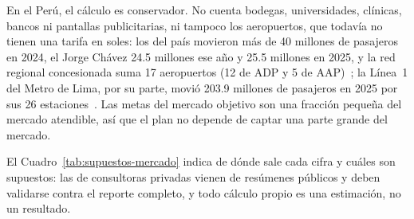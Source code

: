 \documentclass[12pt,a4paper]{article}
\begin{document}
En el Perú, el cálculo es conservador. No cuenta bodegas, universidades,
clínicas, bancos ni pantallas publicitarias, ni tampoco los aeropuertos, que
todavía no tienen una tarifa en soles: los del país movieron más de 40
millones de pasajeros en 2024, el Jorge Chávez 24.5 millones ese año y 25.5
millones en 2025, y la red regional concesionada suma 17 aeropuertos (12 de
ADP y 5 de AAP)~\cite{andina2025,andina2026}; la Línea~1 del Metro de Lima, por
su parte, movió 203.9 millones de pasajeros en 2025 por sus 26
estaciones~\cite{energiminas}. Las metas del mercado objetivo son una fracción pequeña del
mercado atendible, así que el plan no depende de captar una parte grande del mercado.

El Cuadro~\ref{tab:supuestos-mercado} indica de dónde sale cada cifra y cuáles
son supuestos: las de consultoras privadas vienen de resúmenes públicos y
deben validarse contra el reporte completo, y todo cálculo propio es una
estimación, no un resultado.
\end{document}
